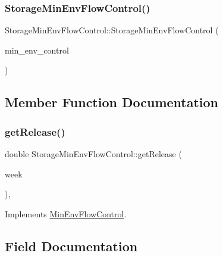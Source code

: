 \subsubsection{\texorpdfstring{Storage\+Min\+Env\+Flow\+Control()}{StorageMinEnvFlowControl()}\hspace{0.1cm}{\footnotesize\ttfamily [2/2]}}
{\footnotesize\ttfamily Storage\+Min\+Env\+Flow\+Control\+::\+Storage\+Min\+Env\+Flow\+Control (\begin{DoxyParamCaption}\item[{const \mbox{\hyperlink{classStorageMinEnvFlowControl}{Storage\+Min\+Env\+Flow\+Control}} \&}]{min\+\_\+env\+\_\+control }\end{DoxyParamCaption})}



\subsection{Member Function Documentation}
\mbox{\label{classStorageMinEnvFlowControl_ae78055a8be7ad9e119384958ef88e174_ae78055a8be7ad9e119384958ef88e174}} 
\subsubsection{\texorpdfstring{get\+Release()}{getRelease()}}
{\footnotesize\ttfamily double Storage\+Min\+Env\+Flow\+Control\+::get\+Release (\begin{DoxyParamCaption}\item[{int}]{week }\end{DoxyParamCaption})\hspace{0.3cm}{\ttfamily [private]}, {\ttfamily [virtual]}}



Implements \mbox{\hyperlink{classMinEnvFlowControl_a5de79615852eb0c937dd559a9eb9402d_a5de79615852eb0c937dd559a9eb9402d}{Min\+Env\+Flow\+Control}}.



\subsection{Field Documentation}
\mbox{\label{classStorageMinEnvFlowControl_af187563525a0b5b437d27134bff34646_af187563525a0b5b437d27134bff34646}} 

